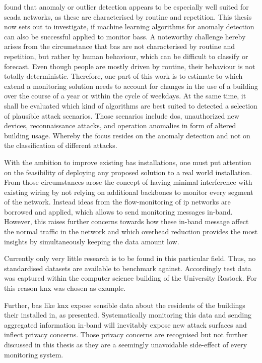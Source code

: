 \textcite{Yang2006} found that anomaly or outlier detection appears to be especially well suited for \gls{scada} networks, as these are characterised by routine and repetition.
This thesis now sets out to investigate, if machine learning algorithms for anomaly detection can also be successful applied to monitor \glspl{bas}. A noteworthy challenge hereby arises from the circumstance that \gls{bas} are not characterised by routine and repetition, but rather by human behaviour, which can be difficult to classify or forecast. Even though people are mostly driven by routine, their behaviour is not totally deterministic.
Therefore, one part of this work is to estimate to which extend a monitoring solution needs to account for changes in the use of a building over the course of a year or within the cycle of weekdays.
At the same time, it shall be evaluated which kind of algorithms are best suited to detected a selection of plausible attack scenarios.
Those scenarios include \gls{dos}, unauthorized new devices, reconnaissance attacks, and operation anomalies in form of altered building usage.
Whereby the focus resides on the anomaly detection and not on the classification of different attacks.

With the ambition to improve existing \gls{bas} installations, one must put attention on the feasibility of deploying any proposed solution to a real world installation. From those circumstances arose the concept of having minimal interference with existing wiring by not relying on additional backbones to monitor every segment of the network. Instead ideas from the flow-monitoring of \gls{ip} networks are borrowed and applied, which allows to send monitoring messages in-band.
However, this raises further concerns towards how these in-band message affect the normal traffic in the network and which overhead reduction provides the most insights by simultaneously keeping the data amount low.

Currently only very little research is to be found in this particular field. 
Thus, no standardised datasets are available to benchmark against. Accordingly test data was captured within the computer science building of the University Rostock. For this reason \gls{knx} was chosen as example.

Further, \gls{bas} like \gls{knx} expose sensible data about the residents of the buildings their installed in, as \textcite{Mundt2012} presented.
Systematically monitoring this data and sending aggregated information in-band will inevitably expose new attack surfaces and inflect privacy concerns.
Those privacy concerns are recognised but not further discussed in this thesis as they are a seemingly unavoidable side-effect of every monitoring system.

